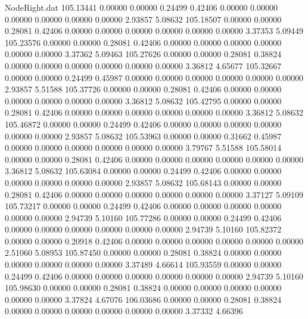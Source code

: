 \begin{filecontents}{NodeRight.dat}
 105.13441    0.00000    0.00000     0.24499    0.42406    0.00000    0.00000    0.00000    0.00000    0.00000    0.00000    2.93857    5.08632
 105.18507    0.00000    0.00000     0.28081    0.42406    0.00000    0.00000    0.00000    0.00000    0.00000    0.00000    3.37353    5.09449
 105.23576    0.00000    0.00000     0.28081    0.42406    0.00000    0.00000    0.00000    0.00000    0.00000    0.00000    3.37362    5.09463
 105.27626    0.00000    0.00000     0.28081    0.38824    0.00000    0.00000    0.00000    0.00000    0.00000    0.00000    3.36812    4.65677
 105.32667    0.00000    0.00000     0.24499    0.45987    0.00000    0.00000    0.00000    0.00000    0.00000    0.00000    2.93857    5.51588
 105.37726    0.00000    0.00000     0.28081    0.42406    0.00000    0.00000    0.00000    0.00000    0.00000    0.00000    3.36812    5.08632
 105.42795    0.00000    0.00000     0.28081    0.42406    0.00000    0.00000    0.00000    0.00000    0.00000    0.00000    3.36812    5.08632
 105.46872    0.00000    0.00000     0.24499    0.42406    0.00000    0.00000    0.00000    0.00000    0.00000    0.00000    2.93857    5.08632
 105.53963    0.00000    0.00000     0.31662    0.45987    0.00000    0.00000    0.00000    0.00000    0.00000    0.00000    3.79767    5.51588
 105.58014    0.00000    0.00000     0.28081    0.42406    0.00000    0.00000    0.00000    0.00000    0.00000    0.00000    3.36812    5.08632
 105.63084    0.00000    0.00000     0.24499    0.42406    0.00000    0.00000    0.00000    0.00000    0.00000    0.00000    2.93857    5.08632
 105.68143    0.00000    0.00000     0.28081    0.42406    0.00000    0.00000    0.00000    0.00000    0.00000    0.00000    3.37127    5.09109
 105.73217    0.00000    0.00000     0.24499    0.42406    0.00000    0.00000    0.00000    0.00000    0.00000    0.00000    2.94739    5.10160
 105.77286    0.00000    0.00000     0.24499    0.42406    0.00000    0.00000    0.00000    0.00000    0.00000    0.00000    2.94739    5.10160
 105.82372    0.00000    0.00000     0.20918    0.42406    0.00000    0.00000    0.00000    0.00000    0.00000    0.00000    2.51060    5.08953
 105.87450    0.00000    0.00000     0.28081    0.38824    0.00000    0.00000    0.00000    0.00000    0.00000    0.00000    3.37489    4.66614
 105.93559    0.00000    0.00000     0.24499    0.42406    0.00000    0.00000    0.00000    0.00000    0.00000    0.00000    2.94739    5.10160
 105.98630    0.00000    0.00000     0.28081    0.38824    0.00000    0.00000    0.00000    0.00000    0.00000    0.00000    3.37824    4.67076
 106.03686    0.00000    0.00000     0.28081    0.38824    0.00000    0.00000    0.00000    0.00000    0.00000    0.00000    3.37332    4.66396

\end{filecontents}
